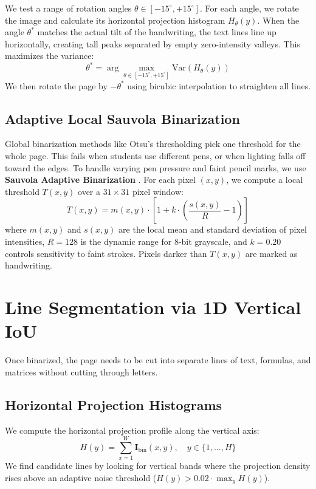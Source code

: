 We test a range of rotation angles $\theta \in [-15^\circ, +15^\circ]$. For each angle, we rotate the image and calculate its horizontal projection histogram $H_\theta(y)$. When the angle $\theta^*$ matches the actual tilt of the handwriting, the text lines line up horizontally, creating tall peaks separated by empty zero-intensity valleys. This maximizes the variance:
\begin{equation}
\theta^* = \arg\max_{\theta \in [-15^\circ, +15^\circ]} \text{Var}\left( H_\theta(y) \right)
\end{equation}
We then rotate the page by $-\theta^*$ using bicubic interpolation to straighten all lines.

\subsection{Adaptive Local Sauvola Binarization}
Global binarization methods like Otsu's thresholding \cite{otsu1979threshold} pick one threshold for the whole page. This fails when students use different pens, or when lighting falls off toward the edges. To handle varying pen pressure and faint pencil marks, we use \textbf{Sauvola Adaptive Binarization} \cite{sauvola2000adaptive}. For each pixel $(x, y)$, we compute a local threshold $T(x, y)$ over a $31 \times 31$ pixel window:
\begin{equation}
T(x, y) = m(x, y) \cdot \left[ 1 + k \cdot \left( \frac{s(x, y)}{R} - 1 \right) \right]
\end{equation}
where $m(x, y)$ and $s(x, y)$ are the local mean and standard deviation of pixel intensities, $R = 128$ is the dynamic range for 8-bit grayscale, and $k = 0.20$ controls sensitivity to faint strokes. Pixels darker than $T(x, y)$ are marked as handwriting.

\section{Line Segmentation via 1D Vertical IoU}
\label{sec:iou_nms_segmentation}

Once binarized, the page needs to be cut into separate lines of text, formulas, and matrices without cutting through letters.

\subsection{Horizontal Projection Histograms}
We compute the horizontal projection profile along the vertical axis:
\begin{equation}
H(y) = \sum_{x=1}^{W} \mathbf{I}_{\text{bin}}(x, y), \quad y \in \{1, \dots, H\}
\end{equation}
We find candidate lines by looking for vertical bands where the projection density rises above an adaptive noise threshold ($H(y) > 0.02 \cdot \max_y H(y)$).

